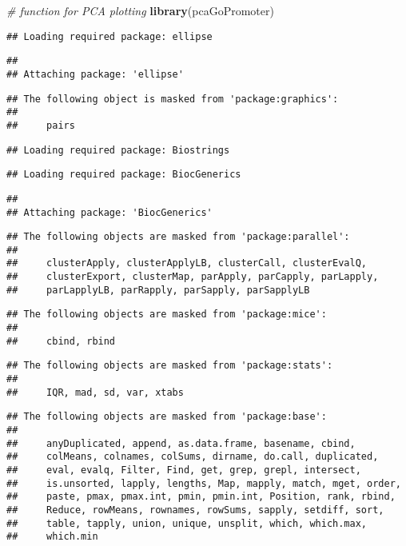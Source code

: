 \documentclass[]{article}
\newenvironment{Shaded}{\begin{snugshade}}{\end{snugshade}}
\newcommand{\KeywordTok}[1]{\textcolor[rgb]{0.13,0.29,0.53}{\textbf{#1}}}
\newcommand{\CommentTok}[1]{\textcolor[rgb]{0.56,0.35,0.01}{\textit{#1}}}
\newcommand{\NormalTok}[1]{#1}
\begin{document}
\begin{Shaded}
\begin{Highlighting}[]
\CommentTok{# function for PCA plotting}
\KeywordTok{library}\NormalTok{(pcaGoPromoter)}
\end{Highlighting}
\end{Shaded}

\begin{verbatim}
## Loading required package: ellipse
\end{verbatim}

\begin{verbatim}
## 
## Attaching package: 'ellipse'
\end{verbatim}

\begin{verbatim}
## The following object is masked from 'package:graphics':
## 
##     pairs
\end{verbatim}

\begin{verbatim}
## Loading required package: Biostrings
\end{verbatim}

\begin{verbatim}
## Loading required package: BiocGenerics
\end{verbatim}

\begin{verbatim}
## 
## Attaching package: 'BiocGenerics'
\end{verbatim}

\begin{verbatim}
## The following objects are masked from 'package:parallel':
## 
##     clusterApply, clusterApplyLB, clusterCall, clusterEvalQ,
##     clusterExport, clusterMap, parApply, parCapply, parLapply,
##     parLapplyLB, parRapply, parSapply, parSapplyLB
\end{verbatim}

\begin{verbatim}
## The following objects are masked from 'package:mice':
## 
##     cbind, rbind
\end{verbatim}

\begin{verbatim}
## The following objects are masked from 'package:stats':
## 
##     IQR, mad, sd, var, xtabs
\end{verbatim}

\begin{verbatim}
## The following objects are masked from 'package:base':
## 
##     anyDuplicated, append, as.data.frame, basename, cbind,
##     colMeans, colnames, colSums, dirname, do.call, duplicated,
##     eval, evalq, Filter, Find, get, grep, grepl, intersect,
##     is.unsorted, lapply, lengths, Map, mapply, match, mget, order,
##     paste, pmax, pmax.int, pmin, pmin.int, Position, rank, rbind,
##     Reduce, rowMeans, rownames, rowSums, sapply, setdiff, sort,
##     table, tapply, union, unique, unsplit, which, which.max,
##     which.min
\end{verbatim}
\end{document}
